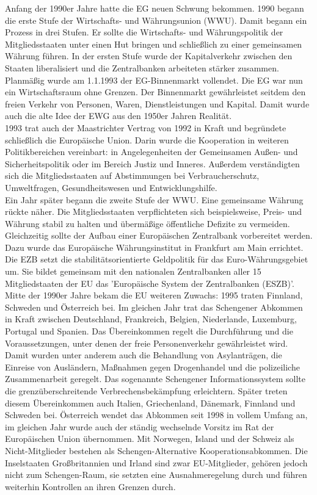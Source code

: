 \documentclass[letterpaper, 12pt]{article}
\begin{document}
Anfang der 1990er Jahre hatte die EG neuen Schwung bekommen. 1990 begann die erste Stufe der Wirtschafts- und Währungsunion (WWU). Damit begann ein Prozess in drei Stufen. Er sollte die Wirtschafts- und Währungspolitik der Mitgliedsstaaten unter einen Hut bringen und schließlich zu einer gemeinsamen Währung führen. In der ersten Stufe wurde der Kapitalverkehr zwischen den Staaten liberalisiert und die Zentralbanken arbeiteten stärker zusammen. \\
Planmäßig wurde am 1.1.1993 der EG-Binnenmarkt vollendet. Die EG war nun ein Wirtschaftsraum ohne Grenzen. Der Binnenmarkt gewährleistet seitdem den freien Verkehr von Personen, Waren, Dienstleistungen und Kapital. Damit wurde auch die alte Idee der EWG aus den 1950er Jahren Realität. \\
1993 trat auch der Maastrichter Vertrag von 1992 in Kraft und begründete schließlich die Europäische Union. Darin wurde die Kooperation in weiteren Politikbereichen vereinbart: in Angelegenheiten der Gemeinsamen Außen- und Sicherheitspolitik oder im Bereich Justiz und Inneres. Außerdem verständigten sich die Mitgliedsstaaten auf Abstimmungen bei Verbraucherschutz, Umweltfragen, Gesundheitswesen und Entwicklungshilfe. \\
Ein Jahr später begann die zweite Stufe der WWU. Eine gemeinsame Währung rückte näher. Die Mitgliedsstaaten verpflichteten sich beispielsweise, Preis- und Währung stabil zu halten und übermäßige öffentliche Defizite zu vermeiden. Gleichzeitig sollte der Aufbau einer Europäischen Zentralbank vorbereitet werden. Dazu wurde das Europäische Währungsinstitut in Frankfurt am Main errichtet. Die EZB setzt die stabilitätsorientierte Geldpolitik für das Euro-Währungsgebiet um. Sie bildet gemeinsam mit den nationalen Zentralbanken aller 15 Mitgliedstaaten der EU das 'Europäische System der Zentralbanken (ESZB)'. \\
Mitte der 1990er Jahre bekam die EU weiteren Zuwachs: 1995 traten Finnland, Schweden und Österreich bei. Im gleichen Jahr trat das Schengener Abkommen in Kraft zwischen Deutschland, Frankreich, Belgien, Niederlande, Luxemburg, Portugal und Spanien. Das Übereinkommen regelt die Durchführung und die Voraussetzungen, unter denen der freie Personenverkehr gewährleistet wird. Damit wurden unter anderem auch die Behandlung von Asylanträgen, die Einreise von Ausländern, Maßnahmen gegen Drogenhandel und die polizeiliche Zusammenarbeit geregelt. Das sogenannte Schengener Informationssystem sollte die grenzüberschreitende Verbrechensbekämpfung erleichtern. Später treten diesem Übereinkommen auch Italien, Griechenland, Dänemark, Finnland und Schweden bei. Österreich wendet das Abkommen seit 1998 in vollem Umfang an, im gleichen Jahr wurde auch der ständig wechselnde Vorsitz im Rat der Europäischen Union übernommen. Mit Norwegen, Island und der Schweiz als Nicht-Mitglieder bestehen als Schengen-Alternative Kooperationsabkommen. Die Inselstaaten Großbritannien und Irland sind zwar EU-Mitglieder, gehören jedoch nicht zum Schengen-Raum, sie setzten eine Ausnahmeregelung durch und führen weiterhin Kontrollen an ihren Grenzen durch. \\
\end{document}
